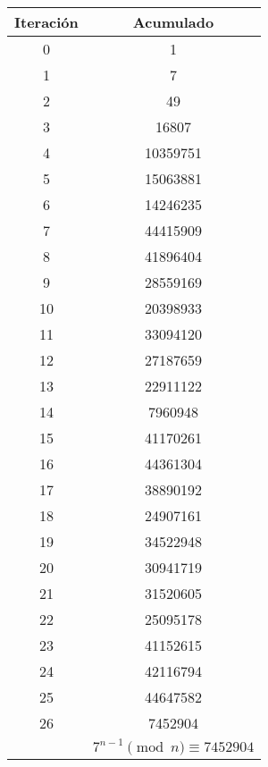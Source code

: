 \documentclass[fleqn]{article}
\begin{document}
        \begin{tabular}{c | c}
            Iteración & Acumulado \\ \hline
            0 & 1 \\
            1 & 7   \\
            2 & 49  \\
            3 & 16807   \\
            4 & 10359751    \\
            5 & 15063881    \\
            6 & 14246235    \\
            7 & 44415909    \\
            8 & 41896404    \\
            9 & 28559169    \\
           10 & 20398933    \\
           11 & 33094120    \\
           12 & 27187659    \\
           13 & 22911122    \\
           14 & 7960948     \\
           15 & 41170261    \\
           16 & 44361304    \\
           17 & 38890192    \\
           18 & 24907161    \\
           19 & 34522948    \\
           20 & 30941719    \\
           21 & 31520605    \\
           22 & 25095178    \\
           23 & 41152615    \\
           24 & 42116794    \\
           25 & 44647582    \\
           26 & 7452904     \\ \hline
           & $ 7^{n-1} \pmod{n} \equiv 7452904 $
        \end{tabular}
\end{document}
